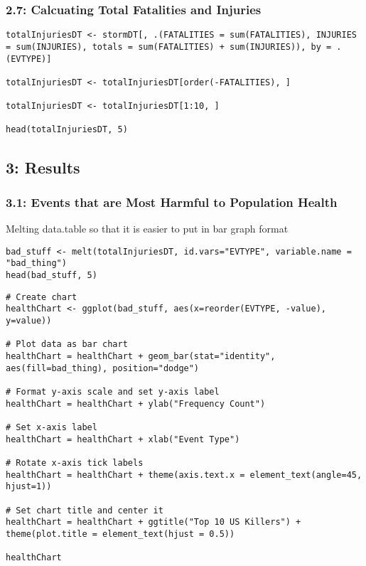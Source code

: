 \documentclass[
]{article}
\begin{document}
\hypertarget{calcuating-total-fatalities-and-injuries}{%
\subsubsection{2.7: Calcuating Total Fatalities and
Injuries}\label{calcuating-total-fatalities-and-injuries}}

\begin{verbatim}
totalInjuriesDT <- stormDT[, .(FATALITIES = sum(FATALITIES), INJURIES = sum(INJURIES), totals = sum(FATALITIES) + sum(INJURIES)), by = .(EVTYPE)]

totalInjuriesDT <- totalInjuriesDT[order(-FATALITIES), ]

totalInjuriesDT <- totalInjuriesDT[1:10, ]

head(totalInjuriesDT, 5)
\end{verbatim}

\hypertarget{results}{%
\subsection{3: Results}\label{results}}

\hypertarget{events-that-are-most-harmful-to-population-health}{%
\subsubsection{3.1: Events that are Most Harmful to Population
Health}\label{events-that-are-most-harmful-to-population-health}}

Melting data.table so that it is easier to put in bar graph format

\begin{verbatim}
bad_stuff <- melt(totalInjuriesDT, id.vars="EVTYPE", variable.name = "bad_thing")
head(bad_stuff, 5)
\end{verbatim}

\begin{verbatim}
# Create chart
healthChart <- ggplot(bad_stuff, aes(x=reorder(EVTYPE, -value), y=value))

# Plot data as bar chart
healthChart = healthChart + geom_bar(stat="identity", aes(fill=bad_thing), position="dodge")

# Format y-axis scale and set y-axis label
healthChart = healthChart + ylab("Frequency Count") 

# Set x-axis label
healthChart = healthChart + xlab("Event Type") 

# Rotate x-axis tick labels 
healthChart = healthChart + theme(axis.text.x = element_text(angle=45, hjust=1))

# Set chart title and center it
healthChart = healthChart + ggtitle("Top 10 US Killers") + theme(plot.title = element_text(hjust = 0.5))

healthChart
\end{verbatim}
\end{document}
